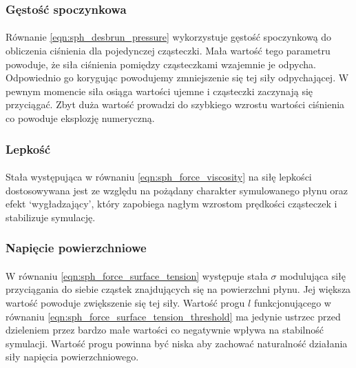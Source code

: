 \subsubsection{Gęstość spoczynkowa}

\paragraph{}
Równanie \eqref{eqn:sph_desbrun_pressure} wykorzystuje gęstość spoczynkową do obliczenia ciśnienia dla pojedynczej cząsteczki. Mała wartość tego parametru powoduje, że siła ciśnienia pomiędzy cząsteczkami wzajemnie je odpycha. Odpowiednio go korygując powodujemy zmniejszenie się tej siły odpychającej. W pewnym momencie siła osiąga wartości ujemne i cząsteczki zaczynają się przyciągać. Zbyt duża wartość prowadzi do szybkiego wzrostu wartości ciśnienia co powoduje eksplozję numeryczną.
\par

\subsubsection{Lepkość}

\paragraph{}
Stała występująca w równaniu \eqref{eqn:sph_force_viscosity} na siłę lepkości dostosowywana jest ze względu na pożądany charakter symulowanego płynu oraz efekt `wygładzający', który zapobiega nagłym wzrostom prędkości cząsteczek i stabilizuje symulację.
\par

\subsubsection{Napięcie powierzchniowe}

\paragraph{}
W równaniu \eqref{eqn:sph_force_surface_tension} występuje stała $\sigma$ modulująca siłę przyciągania do siebie cząstek znajdujących się na powierzchni płynu. Jej większa wartość powoduje zwiększenie się tej siły.
Wartość progu $l$ funkcjonującego w równaniu \eqref{eqn:sph_force_surface_tension_threshold} ma jedynie ustrzec przed dzieleniem przez bardzo małe wartości co negatywnie wpływa na stabilność symulacji. Wartość progu powinna być niska aby zachować naturalność działania siły napięcia powierzchniowego.
\par